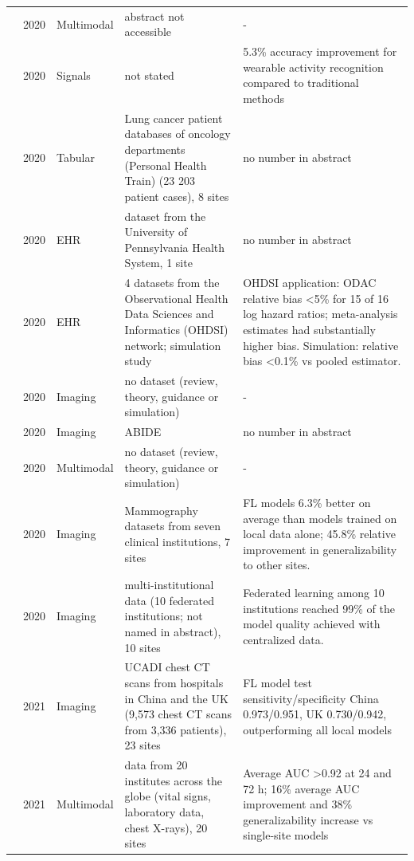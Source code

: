 \begin{longtable}{@{}p{2.6cm}p{0.7cm}p{1.2cm}p{4.4cm}p{4.6cm}@{}}
\cite{beyan2020distributed} & 2020 & Multimodal & abstract not accessible & -\\
\cite{chen2020fedhealth} & 2020 & Signals & not stated & 5.3\% accuracy improvement for wearable activity recognition compared to traditional methods\\
\cite{deist2020distributed} & 2020 & Tabular & Lung cancer patient databases of oncology departments (Personal Health Train) (23 203 patient cases), 8 sites & no number in abstract\\
\cite{duan2020learning} & 2020 & EHR & dataset from the University of Pennsylvania Health System, 1 site & no number in abstract\\
\cite{duan2020learninglocal} & 2020 & EHR & 4 datasets from the Observational Health Data Sciences and Informatics (OHDSI) network; simulation study & OHDSI application: ODAC relative bias <5\% for 15 of 16 log hazard ratios; meta-analysis estimates had substantially higher bias. Simulation: relative bias <0.1\% vs pooled estimator.\\
\cite{kaissis2020secure} & 2020 & Imaging & no dataset (review, theory, guidance or simulation) & -\\
\cite{li2020multi} & 2020 & Imaging & ABIDE & no number in abstract\\
\cite{rieke2020future} & 2020 & Multimodal & no dataset (review, theory, guidance or simulation) & -\\
\cite{roth2020federated} & 2020 & Imaging & Mammography datasets from seven clinical institutions, 7 sites & FL models 6.3\% better on average than models trained on local data alone; 45.8\% relative improvement in generalizability to other sites.\\
\cite{sheller2020federated} & 2020 & Imaging & multi-institutional data (10 federated institutions; not named in abstract), 10 sites & Federated learning among 10 institutions reached 99\% of the model quality achieved with centralized data.\\
\cite{bai2021advancing} & 2021 & Imaging & UCADI chest CT scans from hospitals in China and the UK (9,573 chest CT scans from 3,336 patients), 23 sites & FL model test sensitivity/specificity China 0.973/0.951, UK 0.730/0.942, outperforming all local models\\
\cite{dayan2021federated} & 2021 & Multimodal & data from 20 institutes across the globe (vital signs, laboratory data, chest X-rays), 20 sites & Average AUC >0.92 at 24 and 72 h; 16\% average AUC improvement and 38\% generalizability increase vs single-site models\\

\end{longtable}
